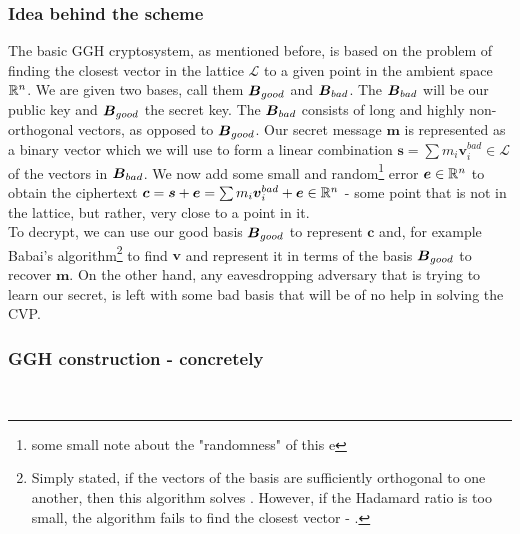 \subsubsection*{Idea behind the scheme}
The basic GGH cryptosystem, as mentioned before, is based on the problem of finding the closest vector in the lattice $\mathcal{L}$ to a given point in the ambient space $\mathbb{R}^n$. We are given two bases, call them $\boldsymbol{B}_{good}$ and $\boldsymbol{B}_{bad}$. The $\boldsymbol{B}_{bad}$ will be our public key and $\boldsymbol{B}_{good}$ the secret key. The $\boldsymbol{B}_{bad}$ consists of long and highly non-orthogonal vectors, as opposed to $\boldsymbol{B}_{good}$. Our secret message $\bm{m}$ is represented as a binary vector which we will use to form a linear combination $\bm{s} = \sum m_i \bm{v}_i^{bad} \in \mathcal{L}$ of the vectors in $\boldsymbol{B}_{bad}$. We now add some small and random\footnote{some small note about the "randomness" of this e} error $\boldsymbol{e} \in \mathbb{R}^n$ to obtain the ciphertext $\boldsymbol{c} = \boldsymbol{s} + \boldsymbol{e} = \sum m_i \boldsymbol{v}_i^{bad} + \boldsymbol{e} \in \mathbb{R}^n$ - some point that is not in the lattice, but rather, very close to a point in it.\\
To decrypt, we can use our good basis $\boldsymbol{B}_{good}$ to represent $\bm{c}$ and, for example Babai's algorithm\footnote{Simply stated, if the vectors of the basis are sufficiently orthogonal to one another, then this algorithm solves . However, if the Hadamard ratio is too small, the algorithm fails to find the closest vector - \cite{book}.} to find $\bm{v}$ and represent it in terms of the basis $\boldsymbol{B}_{good}$ to recover $\bm{m}$. On the other hand, any eavesdropping adversary that is trying to learn our secret, is left with some bad basis that will be of no help in solving the CVP.

\subsubsection*{GGH construction - concretely}
\noindent{} \\

